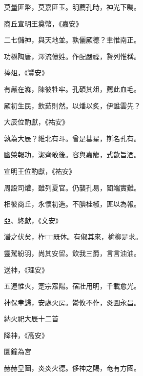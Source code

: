 \begin{pinyinscope}
 莫量匪幣，莫嘉匪玉。明薦孔時，神光下矚。



 商丘宣明王奠幣，《嘉安》



 二七儲神，與天地並。孰儷厥德？聿惟南正。



 功楙陶唐，澤流億姓。作配嚴禋，贄列惟稱。



 捧俎，《豐安》



 有嚴在滌，陳彼牲牢。孔碩其俎，薦此血毛。



 厥初生民，飲茹則然。以燔以炙，伊誰雲先？



 大辰位酌獻，《祐安》



 孰為大辰？維北有斗。曾是彗星，斯名孔有。



 幽榮報功，潔齊敢後。容與嘉觴，式歆旨酒。



 宣明王位酌獻，《祐安》



 周設司爟，雖列夏官。仍襲孔易，闓端實難。



 相彼商丘，永懷初造。不腆桂椒，匪以為報。



 亞、終獻，《文安》



 潛之伏矣，柞□□既休。有俶其來，榆柳是求。



 靈駕紛羽，尚其安留。飲我三爵，言言油油。



 送神，《理安》



 五運惟火，寔宗眾陽。宿壯用明，千載愈光。



 神保聿歸，安處火房。鬱攸不作，炎圖永昌。



 納火祀大辰十二首



 降神，《高安》



 圜鐘為宮



 赫赫皇圖，炎炎火德。侈神之賜，奄有方國。




\end{pinyinscope}
